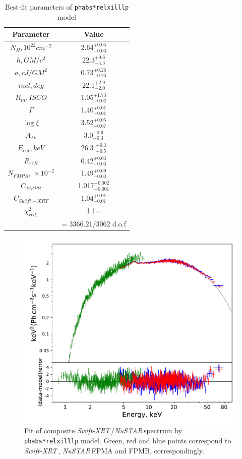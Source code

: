 \documentclass[a4paper,fleqn,usenatbib]{mnras}
\def\swiftx{{\em Swift-XRT\,}}
\def\nustar{{\em NuSTAR\,}}
\begin{document}
\begin{table}
\noindent
\centering
\caption{Best-fit parameters of \texttt{phabs*relxilllp} model}
\label{tab:fullfit}
\centering
\begin{tabular}{|c|c|}
\hline\hline
Parameter & Value \\
\hline
$N_{H}, 10^{22} cm^{-2}$ &   2.64$^{+0.05}_{-0.03}$ \\   
$h, GM/c^{2}$   &  22.3$^{+0.6}_{-4.3}$ \\
$a, cJ/GM^{2}$    & 0.73$^{+0.26}_{-0.23}$   \\
$incl, deg$ & 22.1$^{+2.9}_{-2.0}$ \\
$R_{in}, ISCO$  & 1.05$^{+1.73}_{-0.02}$ \\ 
$\Gamma$& 1.40$^{+0.01}_{-0.01}$   \\
$\log{\xi}$ &  3.52$^{+0.05}_{-0.07}$ \\
$A_{Fe}$   &  3.0$^{+0.6}_{-0.3}$  \\        
$E_{cut}, keV$    &       26.3 $^{+0.3}_{-0.5}$    \\
$R_{refl}$  &         0.42$^{+0.03}_{-0.03}$    \\
$N_{FMPA},\,\times10^{-2}$          &      1.49$^{+0.09}_{-0.03}$ \\
$C_{FMPB}$ & 1.017$^{+0.002}_{-0.001}$    \\
$C_{Swift-XRT}$    &   1.04$^{+0.01}_{-0.01}$\\
$\chi^{2}_{red.}$    &   1.1=\\ 
              &= 3366.21/3062 d.o.f\\
              
\hline
\end{tabular}
\end{table}




\begin{figure}
\centerline{\includegraphics[width=\linewidth]{spectrumfit_v05.pdf}}
\caption{Fit of composite \swiftx/\nustar spectrum by \texttt{phabs*relxilllp} model. Green, red and blue points correspond to \swiftx, \nustar FPMA and FPMB, correspondingly.} 
\label{fig:spec}
\end{figure}  
\end{document}
